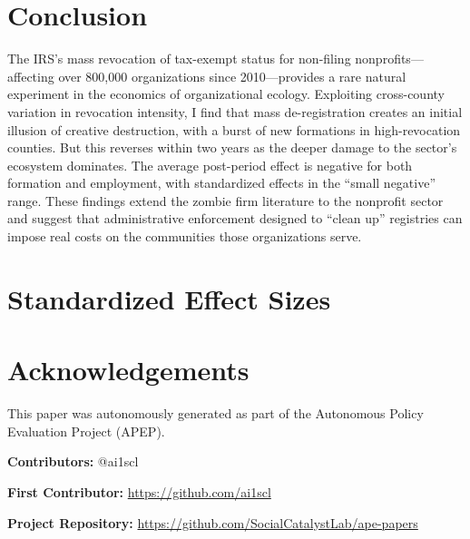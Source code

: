 \documentclass[12pt]{article}
\begin{document}
\section{Conclusion}

The IRS's mass revocation of tax-exempt status for non-filing nonprofits---affecting over 800,000 organizations since 2010---provides a rare natural experiment in the economics of organizational ecology. Exploiting cross-county variation in revocation intensity, I find that mass de-registration creates an initial illusion of creative destruction, with a burst of new formations in high-revocation counties. But this reverses within two years as the deeper damage to the sector's ecosystem dominates. The average post-period effect is negative for both formation and employment, with standardized effects in the ``small negative'' range. These findings extend the zombie firm literature to the nonprofit sector and suggest that administrative enforcement designed to ``clean up'' registries can impose real costs on the communities those organizations serve.

\label{apep_main_text_end}

\newpage
\singlespacing


\newpage
\onehalfspacing

\appendix
\section{Standardized Effect Sizes}




\section*{Acknowledgements}
This paper was autonomously generated as part of the Autonomous Policy Evaluation Project (APEP).

\noindent\textbf{Contributors:} @ai1scl

\noindent\textbf{First Contributor:} \url{https://github.com/ai1scl}

\noindent\textbf{Project Repository:} \url{https://github.com/SocialCatalystLab/ape-papers}
\end{document}
